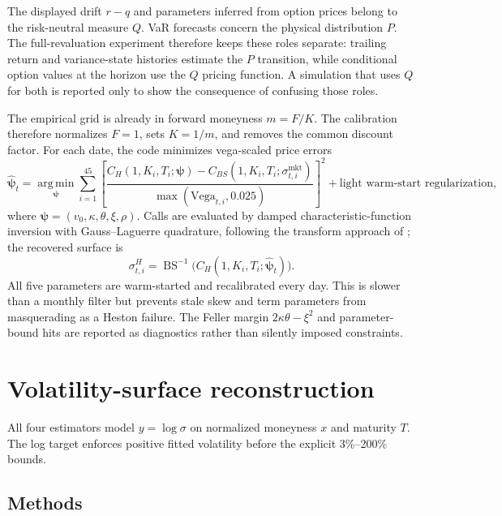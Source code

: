 \documentclass[11pt,a4paper]{article}
\begin{document}
The displayed drift $r-q$ and parameters inferred from option prices belong to the risk-neutral
measure $Q$. VaR forecasts concern the physical distribution $P$. The full-revaluation experiment
therefore keeps these roles separate: trailing return and variance-state histories estimate the
$P$ transition, while conditional option values at the horizon use the $Q$ pricing function. A
simulation that uses $Q$ for both is reported only to show the consequence of confusing those roles.

The empirical grid is already in forward moneyness $m=F/K$. The calibration therefore normalizes
$F=1$, sets $K=1/m$, and removes the common discount factor. For each date, the code minimizes
vega-scaled price errors
\begin{equation}
\widehat{\bm\psi}_t=\operatorname*{arg\,min}_{\bm\psi}
\sum_{i=1}^{45}\left[
\frac{C_H(1,K_i,T_i;\bm\psi)-
C_{BS}(1,K_i,T_i;\sigma^{\mathrm{mkt}}_{t,i})}
{\max(\mathrm{Vega}_{t,i},0.025)}
\right]^2+\text{light warm-start regularization},
\end{equation}
where $\bm\psi=(v_0,\kappa,\theta,\xi,\rho)$. Calls are evaluated by damped characteristic-function
inversion with Gauss--Laguerre quadrature, following the transform approach of
\cite{carrmadan1999}; the recovered surface is
\begin{equation*}
\sigma^H_{t,i}=\operatorname{BS}^{-1}\bigl(C_H(1,K_i,T_i;\widehat{\bm\psi}_t)\bigr).
\end{equation*}
All five parameters are warm-started and recalibrated every day. This is slower than a monthly
filter but prevents stale skew and term parameters from masquerading as a Heston failure. The
Feller margin $2\kappa\theta-\xi^2$ and parameter-bound hits are reported as diagnostics rather than
silently imposed constraints.

\section{Volatility-surface reconstruction}

All four estimators model $y=\log\sigma$ on normalized moneyness $x$ and maturity $T$. The log target
enforces positive fitted volatility before the explicit 3\%--200\% bounds.

\subsection{Methods}
\end{document}
